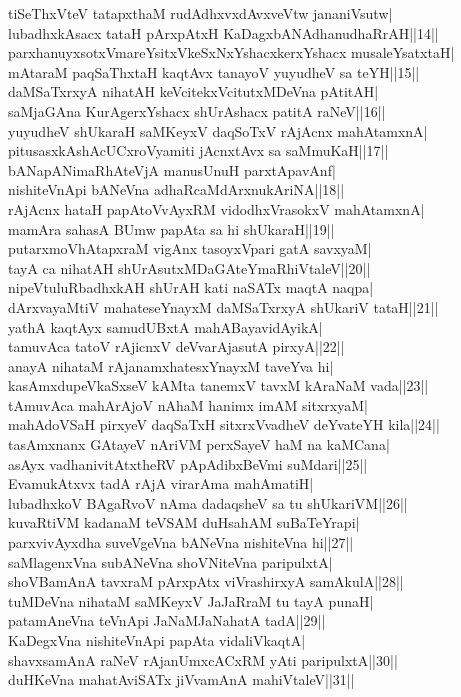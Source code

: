 \documentclass{article}
\begin{document}
tiSeThxVteV tatapxthaM rudAdhxvxdAvxveVtw jananiVsutw|\\
lubadhxkAsacx tataH pArxpAtxH KaDagxbANAdhanudhaRrAH||14||\\
parxhanuyxsotxVmareYsitxVkeSxNxYshacxkerxYshacx musaleYsatxtaH|\\
mAtaraM paqSaThxtaH kaqtAvx tanayoV yuyudheV sa teYH||15||\\
daMSaTxrxyA nihatAH keVcitekxVcitutxMDeVna pAtitAH|\\
saMjaGAna KurAgerxYshacx shUrAshacx patitA raNeV||16||\\
yuyudheV shUkaraH saMKeyxV daqSoTxV rAjAcnx mahAtamxnA|\\
pitusasxkAshAcUCxroVyamiti jAcnxtAvx sa saMmuKaH||17||\\
bANapANimaRhAteVjA manusUnuH parxtApavAnf|\\
nishiteVnApi bANeVna adhaRcaMdArxnukAriNA||18||\\
rAjAcnx hataH papAtoVvAyxRM vidodhxVrasokxV mahAtamxnA|\\
mamAra sahasA BUmw papAta sa hi shUkaraH||19||\\
putarxmoVhAtapxraM vigAnx tasoyxVpari gatA savxyaM|\\
tayA ca nihatAH shUrAsutxMDaGAteYmaRhiVtaleV||20||\\
nipeVtuluRbadhxkAH shUrAH kati naSATx maqtA naqpa|\\
dArxvayaMtiV mahateseYnayxM daMSaTxrxyA shUkariV tataH||21||\\
yathA kaqtAyx samudUBxtA mahABayavidAyikA|\\
tamuvAca tatoV rAjicnxV deVvarAjasutA pirxyA||22||\\
anayA nihataM rAjanamxhatesxYnayxM taveYva hi|\\
kasAmxdupeVkaSxseV kAMta tanemxV tavxM kAraNaM vada||23||\\
tAmuvAca mahArAjoV nAhaM hanimx imAM sitxrxyaM|\\
mahAdoVSaH pirxyeV daqSaTxH sitxrxVvadheV deYvateYH kila||24||\\
tasAmxnanx GAtayeV nAriVM perxSayeV haM na kaMCana|\\
asAyx vadhanivitAtxtheRV pApAdibxBeVmi suMdari||25||\\
EvamukAtxvx tadA rAjA virarAma mahAmatiH|\\
lubadhxkoV BAgaRvoV nAma dadaqsheV sa tu shUkariVM||26||\\
kuvaRtiVM kadanaM teVSAM duHsahAM suBaTeYrapi|\\
parxvivAyxdha suveVgeVna bANeVna nishiteVna hi||27||\\
saMlagenxVna subANeVna shoVNiteVna paripulxtA|\\
shoVBamAnA tavxraM pArxpAtx viVrashirxyA samAkulA||28||\\
tuMDeVna nihataM saMKeyxV JaJaRraM tu tayA punaH|\\
patamAneVna teVnApi JaNaMJaNahatA tadA||29||\\
KaDegxVna nishiteVnApi papAta vidaliVkaqtA|\\
shavxsamAnA raNeV rAjanUmxcACxRM yAti paripulxtA||30||\\
duHKeVna mahatAviSATx jiVvamAnA mahiVtaleV||31||
\end{document}
